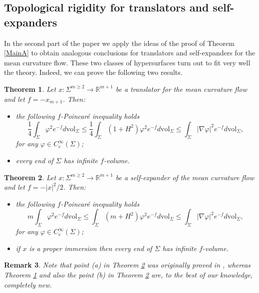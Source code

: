 \documentclass[11pt, leqno]{amsart}
\newtheorem{theorem}{Theorem}[section]
\newtheorem{remark}[theorem]{Remark}
\begin{document}
\subsection{Topological rigidity for translators and self-expanders} In the second part of the paper we apply the ideas of the proof of Theorem \ref{MainA} to obtain analogous conclusions for translators and self-expanders for the mean curvature flow. These two classes of hypersurfaces turn out to fit very well the theory. Indeed, we can prove the following two results.
\begin{theorem}\label{Thmfpoincaretranslato}
Let $x:\Sigma^{m\geq 2}\to\mathbb{R}^{m+1}$ be a translator for the mean curvature flow and let $f=-x_{m+1}$. Then:
\begin{itemize}
\item[(a)] the following $f$-Poincar\'e inequality holds
\begin{equation*}
\frac{1}{4}\int_\Sigma \varphi^2 e^{-f}d\mathrm{vol}_{\Sigma}\leq \frac{1}{4}\int_\Sigma (1+H^2) \varphi^2 e^{-f}d\mathrm{vol}_{\Sigma}\leq \int_\Sigma |\nabla \varphi|^2 e^{-f}d\mathrm{vol}_{\Sigma},
\end{equation*}
for any $\varphi\in C^{\infty}_c(\Sigma)$;
\item[(b)] every end of $\Sigma$ has infinite $f$-volume.
\end{itemize}
\end{theorem}

\begin{theorem}\label{ThmExpTools}
Let $x:\Sigma^{m\geq 2}\to\mathbb{R}^{m+1}$ be a self-expander of the mean curvature flow and let $f=-|x|^2/2$. Then:
\begin{itemize}
\item[(a)] the following $f$-Poincar\'e inequality holds
\begin{equation*}
m\int_\Sigma \varphi^2 e^{-f}d\mathrm{vol}_{\Sigma}\leq \int_\Sigma (m+H^2) \varphi^2 e^{-f}d\mathrm{vol}_{\Sigma}\leq \int_\Sigma |\nabla \varphi|^2 e^{-f}d\mathrm{vol}_{\Sigma},
\end{equation*}
for any $\varphi\in C^{\infty}_c(\Sigma)$;
\item[(b)] if $x$ is a proper immersion then every end of $\Sigma$ has infinite $f$-volume.
\end{itemize}
\end{theorem}

\begin{remark}
\rm{Note that point (a) in Theorem \ref{ThmExpTools} was originally proved in \cite{ChengZhou_Selfexp}, whereas Theorem \ref{Thmfpoincaretranslato} and also the point (b) in Theorem \ref{ThmExpTools} are, to the best of our knowledge,  completely new.}
\end{remark}
\end{document}
